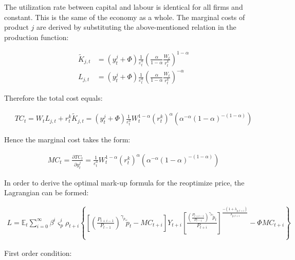 \documentclass{pracamgr}
\numberwithin{equation}{section}
\begin{document}
The utilization rate between capital and labour is identical for all firms and constant. This is the same of the economy as a whole. The marginal costs of product $j$ are derived by substituting the above-mentioned relation in the production function:

\begin{align}
\widetilde{K}_{j,t} &= \left(y_{t}^{j} + \Phi \right) \frac{1}{\varepsilon_{t}^{a}} \left(\frac{\alpha}{1-\alpha} \frac{W_{t}}{r_{t}^{k}} \right)^{1-\alpha} \\
L_{j,t} &= \left(y_{t}^{j} + \Phi \right) \frac{1}{\varepsilon_{t}^{a}} \left(\frac{\alpha}{1-\alpha} \frac{W_{t}}{r_{t}^{k}} \right)^{-\alpha}
\end{align}

Therefore the total cost equals:

\begin{align}
TC_{t} = W_{t}L_{j,t}  + r_{t}^{k} \widetilde{K}_{j,t} =  \left(y_{t}^{j} + \Phi \right) \frac{1}{\varepsilon_{t}^{a}} W_{t}^{1-\alpha} \left(r_{t}^{k} \right)^{\alpha} \left( \alpha^{-\alpha} (1-\alpha)^{-(1-\alpha)}\right)
\end{align}

Hence the marginal cost takes the form:

\begin{align}
MC_{t} = \frac{\partial TC_{t}}{\partial y_{t}^{j}} = \frac{1}{\varepsilon_{t}^{a}} W_{t}^{1-\alpha} \left(r_{t}^{k} \right)^{\alpha} \left( \alpha^{-\alpha} (1-\alpha)^{-(1-\alpha)}\right)
\end{align}

In order to derive the optimal mark-up formula for the reoptimize price, the Lagrangian can be formed:

\begin{align}
L = \mathbb{E}_{t}  \sum\limits_{i=0}^{\infty} \beta^{i} \varsigma_{p}^{i} \rho_{t+i} \left\{ \left[
\left(\frac{P_{t+i-1}}{P_{t-1}} \right)^{\gamma_{p}}\widetilde{p}_{t} - MC_{t+i}
\right] Y_{t+i} \left[ \frac{\left(\frac{P_{t+i-1}}{P_{t-1}} \right)^{\gamma_{p}}\widetilde{p}_{t}}{P_{t+i}} \right]^{\frac{-(1+\lambda_{p,t+i})}{\lambda_{p,t+i}}} - \Phi MC_{t+i} \right\}
\end{align}

First order condition:
\end{document}
